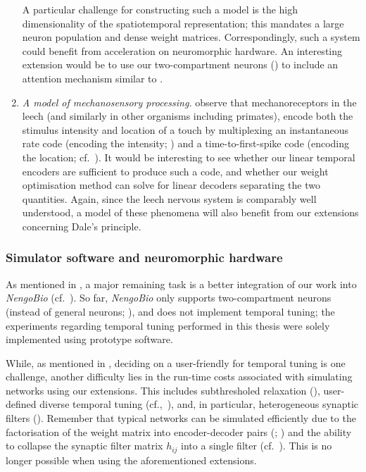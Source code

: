 \begin{enumerate}[1.]
	A particular challenge for constructing such a model is the high dimensionality of the spatiotemporal representation; this mandates a large neuron population and dense weight matrices.
	Correspondingly, such a system could benefit from acceleration on neuromorphic hardware.
	An interesting extension would be to use our two-compartment \LIF neurons () to include an attention mechanism similar to \citet{bobier2014unifying}.

	\item \emph{A model of mechanosensory processing.}
	 observe that mechanoreceptors in the leech (and similarly in other organisms including primates), encode both the stimulus intensity and location of a touch by multiplexing an instantaneous rate code (encoding the intensity; ) and a time-to-first-spike code (encoding the location; cf.~\cite{thorpe2001spikebased}).
	It would be interesting to see whether our linear temporal encoders are sufficient to produce such a code, and whether our weight optimisation method can solve for linear decoders separating the two quantities.
	Again, since the leech nervous system is comparably well understood, a model of these phenomena will also benefit from our extensions concerning Dale's principle.
\end{enumerate}

\subsubsection{Simulator software and neuromorphic hardware}

As mentioned in , a major remaining task is a better integration of our work into \emph{NengoBio} (cf.~).
So far, \emph{NengoBio} only supports two-compartment \LIF neurons (instead of general \nlif neurons; ), and does not implement temporal tuning; the experiments regarding temporal tuning performed in this thesis were solely implemented using prototype software.

While, as mentioned in , deciding on a user-friendly \API for temporal tuning is one challenge, another difficulty lies in the run-time costs associated with simulating networks using our extensions.
This includes subthresholed relaxation (), user-defined diverse temporal tuning (cf.,~), and, in particular, heterogeneous synaptic filters ().
Remember that typical \NEF networks can be simulated efficiently due to the factorisation of the weight matrix into encoder-decoder pairs (; \cite{bekolay2014nengo}) and the ability to collapse the synaptic filter matrix $h_{ij}$ into a single filter (cf.~).
This is no longer possible when using the aforementioned extensions.

